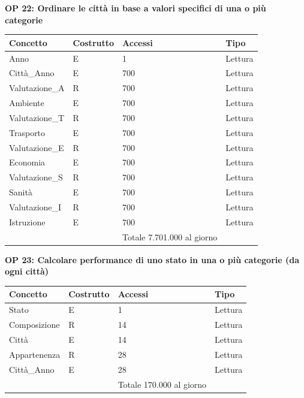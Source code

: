 \documentclass[a4paper,12pt]{report}
\begin{document}
            \textbf{OP 22: Ordinare le città in base a valori specifici di una o più categorie}
        	\begin{table}[h!]
            \centering
             \begin{tabular}{||l l l l||}
             \hline
             Concetto & Costrutto & Accessi & Tipo \\ [0.5ex] 
             \hline\hline
             Anno & E & 1 & Lettura \\ 
             Città\_Anno & E & 700 & Lettura \\ 
             Valutazione\_A & R & 700 & Lettura \\ 
             Ambiente & E & 700 & Lettura \\
             Valutazione\_T & R & 700 & Lettura \\ 
             Trasporto & E & 700 & Lettura \\
             Valutazione\_E & R & 700 & Lettura \\ 
             Economia & E & 700 & Lettura \\
             Valutazione\_S & R & 700 & Lettura \\ 
             Sanità & E & 700 & Lettura \\
             Valutazione\_I & R & 700 & Lettura \\ 
             Istruzione & E & 700 & Lettura \\
             \hline
                &   & Totale  7.701.000 al giorno &  \\ [1ex] 
             \hline
             \end{tabular}
            \end{table}

            \textbf{OP 23: Calcolare performance di uno stato in una o più categorie (da ogni città)}
        	\begin{table}[h!]
            \centering
             \begin{tabular}{||l l l l||}
             \hline
             Concetto & Costrutto & Accessi & Tipo \\ [0.5ex] 
             \hline\hline
             Stato & E & 1 & Lettura \\ 
             Composizione & R & 14 & Lettura \\ 
             Città & E & 14 & Lettura \\ 
             Appartenenza & R & 28 & Lettura \\ 
             Città\_Anno & E & 28 & Lettura \\ 
             \hline
                &   & Totale  170.000 al giorno &  \\ [1ex] 
             \hline
             \end{tabular}
            \end{table}
        	
\end{document}
